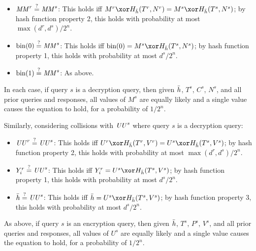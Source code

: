 \documentclass[hctr2.tex]{subfiles}
\begin{document}
\begin{itemize}
    \item \(\mathit{MM}^r \stackrel{\text{?}}{=} \mathit{MM}^s\):
    This holds iff \(M^r \xor H_{\hgen}(T^r, N^r) = M^s \xor H_{\hgen}(T^s, N^s)\);
    by hash function property 2, this holds with probability at most
    \(\max(d^r, d^s)/2^n\).
    \item \(\operatorname{bin}(0) \stackrel{\text{?}}{=} \mathit{MM}^s\):
    This holds iff \(\fromint(0) = M^s \xor H_{\hgen}(T^s, N^s)\);
    by hash function property 1, this holds with probability at most
    \(d^s/2^n\).
    \item \(\operatorname{bin}(1) \stackrel{\text{?}}{=} \mathit{MM}^s\):
    As above.
\end{itemize}

In each case, if query \(s\) is a decryption query,
then given \(\bar{h}\), \(T^s\), \(C^s\), \(N^s\),
and all prior queries and responses,
all values of \(M^s\) are equally likely 
and a single value causes the equation to hold,
for a probability of \(1/2^n\).

Similarly, considering collisions with \(\mathit{UU}^s\) where
query \(s\) is a decryption query:

\begin{itemize}
    \item \(\mathit{UU}^r \stackrel{\text{?}}{=} \mathit{UU}^s\): 
    This holds iff \(U^r \xor H_{\hgen}(T^r, V^r) = U^s \xor H_{\hgen}(T^s, V^s)\);
    by hash function property 2, this holds with probability at most
    \(\max(d^r, d^s)/2^n\).
    \item \(Y_i^r \stackrel{\text{?}}{=} \mathit{UU}^s\):
    This holds iff \(Y_i^r = U^s \xor H_{\hgen}(T^s, V^s)\);
    by hash function property 1, this holds with probability at most
    \(d^s/2^n\).
    \item \(\bar{h} \stackrel{\text{?}}{=} \mathit{UU}^s\):
    This holds iff \(\hgen = U^s \xor H_{\hgen}(T^s, V^s)\);
    by hash function property 3, this holds with probability at most
    \(d^s/2^n\).
\end{itemize}

As above, if query \(s\) is an encryption query,
then given \(\bar{h}\), \(T^s\), \(P^s\), \(V^s\),
and all prior queries and responses,
all values of \(U^s\) are equally likely
and a single value causes the equation to hold,
for a probability of \(1/2^n\).
\end{document}
